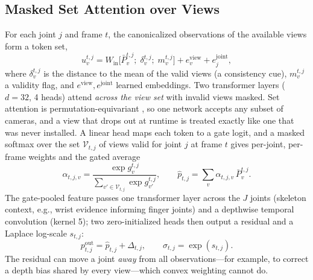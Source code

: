 \documentclass[journal]{IEEEtran}
\begin{document}
\subsection{Masked Set Attention over Views}
For each joint $j$ and frame $t$, the canonicalized observations of the available views form a token set,
\begin{equation}
u^{t,j}_v = W_{\mathrm{in}}\big[\bar{P}^{t,j}_v;\; \delta^{t,j}_v;\; m^{t,j}_v\big] + e^{\mathrm{view}}_v + e^{\mathrm{joint}}_j,
\end{equation}
where $\delta^{t,j}_v$ is the distance to the mean of the valid views (a consistency cue), $m^{t,j}_v$ a validity flag, and $e^{\mathrm{view}}, e^{\mathrm{joint}}$ learned embeddings. Two transformer layers ($d{=}32$, 4 heads) attend \emph{across the view set} with invalid views masked. Set attention is permutation-equivariant \cite{zaheer2017deep}, so one network accepts any subset of cameras, and a view that drops out at runtime is treated exactly like one that was never installed. A linear head maps each token to a gate logit, and a masked softmax over the set $\mathcal{V}_{t,j}$ of views valid for joint $j$ at frame $t$ gives per-joint, per-frame weights and the gated average
\begin{equation}
\alpha_{t,j,v} = \frac{\exp g^{t,j}_v}{\sum_{v'\in\mathcal{V}_{t,j}} \exp g^{t,j}_{v'}},\qquad
\hat{p}_{t,j} = \sum_{v} \alpha_{t,j,v}\, \bar{P}^{t,j}_v .
\end{equation}
The gate-pooled feature passes one transformer layer across the $J$ joints (skeleton context, e.g., wrist evidence informing finger joints) and a depthwise temporal convolution (kernel 5); two zero-initialized heads then output a residual and a Laplace log-scale $s_{t,j}$:
\begin{equation}
p^{\mathrm{out}}_{t,j} = \hat{p}_{t,j} + \Delta_{t,j},\qquad \sigma_{t,j} = \exp(s_{t,j}).
\end{equation}
The residual can move a joint \emph{away} from all observations---for example, to correct a depth bias shared by every view---which convex weighting cannot do.
\end{document}
